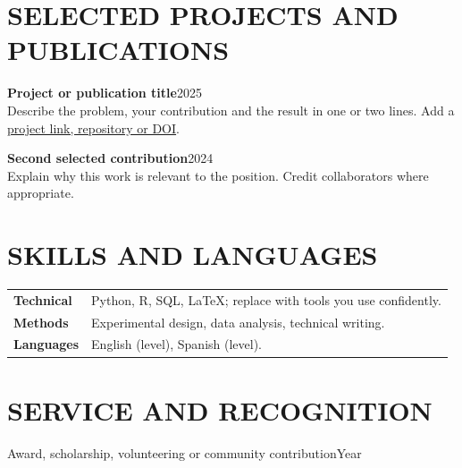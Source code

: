 \documentclass[10pt,a4paper]{article}
\begin{document}
\section{SELECTED PROJECTS AND PUBLICATIONS}
\textbf{Project or publication title}\hfill{\small 2025}\\
Describe the problem, your contribution and the result in one or two lines.
Add a \href{https://example.com}{project link, repository or DOI}.\par
\vspace{3pt}
\textbf{Second selected contribution}\hfill{\small 2024}\\
Explain why this work is relevant to the position. Credit collaborators where appropriate.
\section{SKILLS AND LANGUAGES}
\begin{tabularx}{\linewidth}{@{}lX@{}}
\textbf{Technical} & Python, R, SQL, LaTeX; replace with tools you use confidently.\\[3pt]
\textbf{Methods} & Experimental design, data analysis, technical writing.\\[3pt]
\textbf{Languages} & English (level), Spanish (level).\\
\end{tabularx}
\section{SERVICE AND RECOGNITION}
Award, scholarship, volunteering or community contribution\hfill{\small Year}
\end{document}

